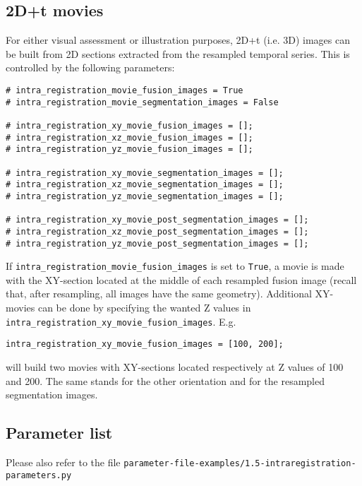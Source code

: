 \subsection{2D+t movies}
\label{sec:cli:intraregistration:movies}
For either visual assessment or illustration purposes, 2D+t (i.e. 3D) images can be built from 2D sections extracted from the resampled temporal series. This is controlled by the following parameters:
\begin{verbatim}
# intra_registration_movie_fusion_images = True
# intra_registration_movie_segmentation_images = False

# intra_registration_xy_movie_fusion_images = [];
# intra_registration_xz_movie_fusion_images = [];
# intra_registration_yz_movie_fusion_images = [];

# intra_registration_xy_movie_segmentation_images = [];
# intra_registration_xz_movie_segmentation_images = [];
# intra_registration_yz_movie_segmentation_images = [];

# intra_registration_xy_movie_post_segmentation_images = [];
# intra_registration_xz_movie_post_segmentation_images = [];
# intra_registration_yz_movie_post_segmentation_images = [];
\end{verbatim}

If \verb|intra_registration_movie_fusion_images| is set to \verb|True|, a movie is made with the  XY-section located at the middle of each resampled fusion image (recall that, after resampling, all images have the same geometry). Additional XY-movies can be done by specifying the wanted Z values in \verb|intra_registration_xy_movie_fusion_images|. E.g.
\begin{verbatim}
intra_registration_xy_movie_fusion_images = [100, 200];
\end{verbatim}
will build two movies with XY-sections located respectively at Z values of 100 and 200. The same stands for the other orientation and for the resampled segmentation images.

\subsection{Parameter list}

Please also refer to the file
\texttt{parameter-file-examples/1.5-intraregistration-parameters.py}

